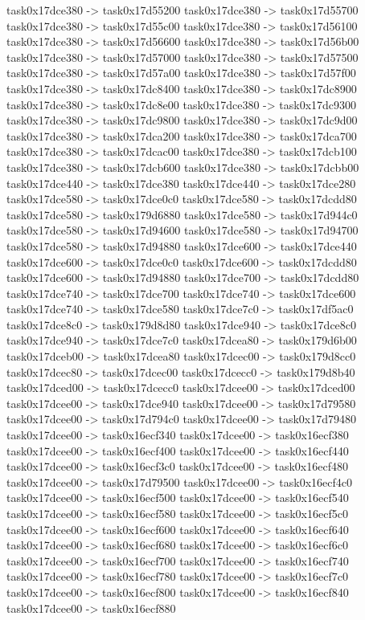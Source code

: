 {	task0x17dce380 -> task0x17d55200
	task0x17dce380 -> task0x17d55700
	task0x17dce380 -> task0x17d55c00
	task0x17dce380 -> task0x17d56100
	task0x17dce380 -> task0x17d56600
	task0x17dce380 -> task0x17d56b00
	task0x17dce380 -> task0x17d57000
	task0x17dce380 -> task0x17d57500
	task0x17dce380 -> task0x17d57a00
	task0x17dce380 -> task0x17d57f00
	task0x17dce380 -> task0x17dc8400
	task0x17dce380 -> task0x17dc8900
	task0x17dce380 -> task0x17dc8e00
	task0x17dce380 -> task0x17dc9300
	task0x17dce380 -> task0x17dc9800
	task0x17dce380 -> task0x17dc9d00
	task0x17dce380 -> task0x17dca200
	task0x17dce380 -> task0x17dca700
	task0x17dce380 -> task0x17dcac00
	task0x17dce380 -> task0x17dcb100
	task0x17dce380 -> task0x17dcb600
	task0x17dce380 -> task0x17dcbb00
	task0x17dce440 -> task0x17dce380
	task0x17dce440 -> task0x17dce280
	task0x17dce580 -> task0x17dce0c0
	task0x17dce580 -> task0x17dcdd80
	task0x17dce580 -> task0x179d6880
	task0x17dce580 -> task0x17d944c0
	task0x17dce580 -> task0x17d94600
	task0x17dce580 -> task0x17d94700
	task0x17dce580 -> task0x17d94880
	task0x17dce600 -> task0x17dce440
	task0x17dce600 -> task0x17dce0c0
	task0x17dce600 -> task0x17dcdd80
	task0x17dce600 -> task0x17d94880
	task0x17dce700 -> task0x17dcdd80
	task0x17dce740 -> task0x17dce700
	task0x17dce740 -> task0x17dce600
	task0x17dce740 -> task0x17dce580
	task0x17dce7c0 -> task0x17df5ac0
	task0x17dce8c0 -> task0x179d8d80
	task0x17dce940 -> task0x17dce8c0
	task0x17dce940 -> task0x17dce7c0
	task0x17dcea80 -> task0x179d6b00
	task0x17dceb00 -> task0x17dcea80
	task0x17dcec00 -> task0x179d8cc0
	task0x17dcec80 -> task0x17dcec00
	task0x17dcecc0 -> task0x179d8b40
	task0x17dced00 -> task0x17dcecc0
	task0x17dcee00 -> task0x17dced00
	task0x17dcee00 -> task0x17dce940
	task0x17dcee00 -> task0x17d79580
	task0x17dcee00 -> task0x17d794c0
	task0x17dcee00 -> task0x17d79480
	task0x17dcee00 -> task0x16ecf340
	task0x17dcee00 -> task0x16ecf380
	task0x17dcee00 -> task0x16ecf400
	task0x17dcee00 -> task0x16ecf440
	task0x17dcee00 -> task0x16ecf3c0
	task0x17dcee00 -> task0x16ecf480
	task0x17dcee00 -> task0x17d79500
	task0x17dcee00 -> task0x16ecf4c0
	task0x17dcee00 -> task0x16ecf500
	task0x17dcee00 -> task0x16ecf540
	task0x17dcee00 -> task0x16ecf580
	task0x17dcee00 -> task0x16ecf5c0
	task0x17dcee00 -> task0x16ecf600
	task0x17dcee00 -> task0x16ecf640
	task0x17dcee00 -> task0x16ecf680
	task0x17dcee00 -> task0x16ecf6c0
	task0x17dcee00 -> task0x16ecf700
	task0x17dcee00 -> task0x16ecf740
	task0x17dcee00 -> task0x16ecf780
	task0x17dcee00 -> task0x16ecf7c0
	task0x17dcee00 -> task0x16ecf800
	task0x17dcee00 -> task0x16ecf840
	task0x17dcee00 -> task0x16ecf880
}
